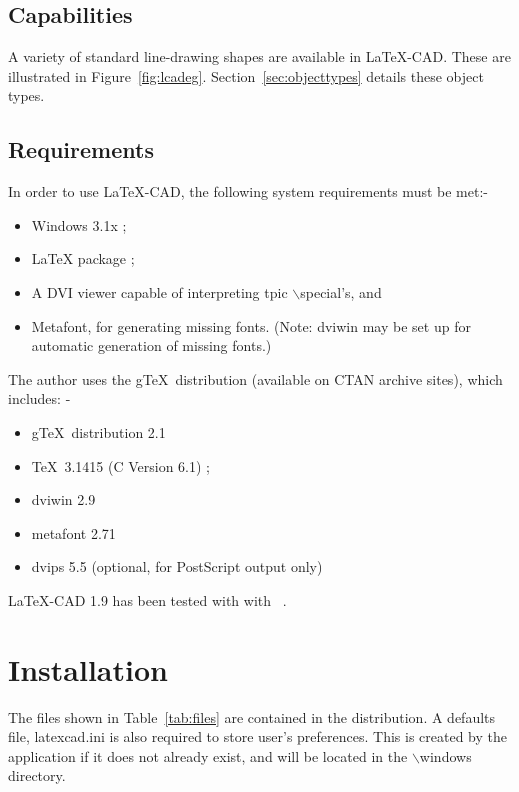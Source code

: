 \documentclass[a4paper]{article}
\newcommand{\bs}{$\backslash$}
\begin{document}
\subsection{ Capabilities }
A variety of standard line-drawing shapes are available in \LaTeX-CAD.
These are illustrated in Figure~\ref{fig:lcadeg}.
Section~\ref{sec:objecttypes} details these object types.



\subsection{ Requirements }
In order to use \LaTeX-CAD, the following system requirements must be met:-
\begin{itemize}
    \item Windows 3.1x ;
    \item \LaTeX\/ package ;
    \item A DVI viewer capable of interpreting tpic \bs special's, and
    \item Metafont, for generating missing fonts. (Note: dviwin may
        be set up for automatic generation of missing fonts.)
\end{itemize}
The author uses the g\TeX\ distribution (available on CTAN archive sites),
which includes: -
\begin{itemize}
    \item g\TeX\ distribution 2.1
    \item \TeX\ 3.1415 (C Version 6.1) ;
    \item dviwin 2.9
    \item metafont 2.71
    \item dvips 5.5 (optional, for PostScript output only)
\end{itemize}

LaTeX-CAD 1.9 has been tested with with \LaTeXe\ .

\section{ Installation }
The files shown in Table~\ref{tab:files} are contained in the
distribution.
A defaults file, latexcad.ini is also required to store
user's preferences. This is created by the application if
it does not already exist, and will be located in
the \bs windows directory.
\end{document}
